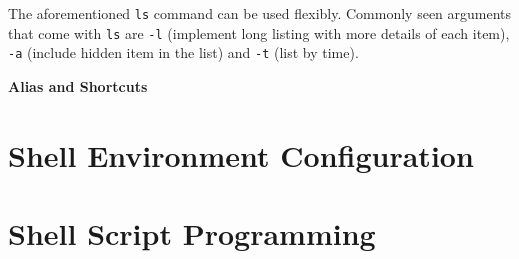 The aforementioned \verb|ls| command can be used flexibly. Commonly seen arguments that come with \verb|ls| are \verb|-l| (implement long listing with more details of each item), \verb|-a| (include hidden item in the list) and \verb|-t| (list by time).

\vspace{0.1in}
\noindent \textbf{Alias and Shortcuts}
\vspace{0.1in}

\section{Shell Environment Configuration}


\section{Shell Script Programming}













